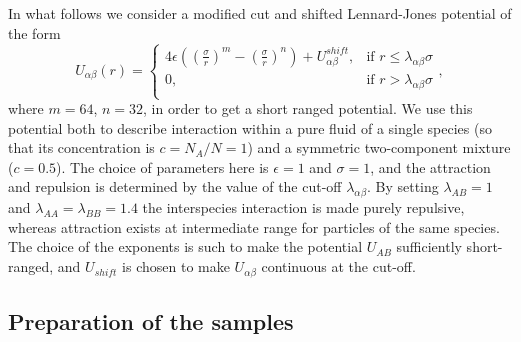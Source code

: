 In what follows we consider a modified cut and shifted Lennard-Jones potential of the form
\begin{equation}
	U_{\alpha \beta}(r) = 
	\left\{
	\begin{array}{rl}
			4 \epsilon \left( \left( \frac{\sigma}{r} \right)^{m} - \left( \frac{\sigma}{r} \right)^{n} \right) + U^{shift}_{\alpha \beta},	& \text{if }	r 		\le		\lambda_{\alpha \beta} \sigma		\\
			0,	& \text{if }	r 	> \lambda_{\alpha \beta} \sigma				\\
	\end{array}
	\right. ,
	\label{eq:ModifiedLennardJones}
\end{equation}
where $m = 64$, $n = 32$, in order to get a short ranged potential. We use this potential both to describe interaction within a pure fluid of a single species (so that its concentration is $c=N_{A}/N=1$) and a symmetric two-component mixture ($c=0.5$).
The choice of parameters here is $\epsilon = 1$ and $\sigma = 1$, and the attraction and repulsion is determined by the value of the cut-off $\lambda_{\alpha \beta}$. By setting $\lambda_{AB} = 1$ and $\lambda_{AA} = \lambda_{BB} = 1.4$ the interspecies interaction is made purely repulsive, whereas attraction exists at intermediate range for particles of the same species. The choice of the exponents is such to make the potential $U_{AB}$ sufficiently short-ranged, and $U_{shift}$ is chosen to make $U_{\alpha \beta}$ continuous at the cut-off.

\subsection*{Preparation of the samples}


